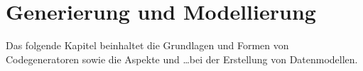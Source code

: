 \chapter{Generierung und Modellierung}
\label{chap:generation_and_modeling}


Das folgende Kapitel beinhaltet die Grundlagen und Formen von Codegeneratoren sowie die Aspekte und \ldots bei der Erstellung von Datenmodellen.




